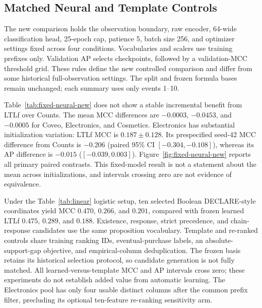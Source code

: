 \documentclass[sigconf,anonymous,nonacm]{acmart}
\newif\ifrevisions
\newcommand{\rev}[1]{\ifrevisions\textcolor{red}{#1}\else#1\fi}
\newenvironment{revblock}{\begingroup\ifrevisions\color{red}\fi}{\endgroup}
\begin{document}
\begin{revblock}
\subsection{Matched Neural and Template Controls}
\begin{table}[t]
\centering\small\setlength{\tabcolsep}{3pt}
\caption{\rev{Fixed-origin neural prediction, event 10 and $H=10$. All rows include the same first-ten-event raw encoder within each dataset. Values are mean $\pm$ sample SD over training seeds 42, 43, and 44.}}
\label{tab:fixed-neural-new}
\resizebox{\columnwidth}{!}{}
\end{table}
The new comparison holds the observation boundary, raw encoder, 64-wide classification head, 25-epoch cap, patience 5, batch size 256, and optimizer settings fixed across four conditions. Vocabularies and scalers use training prefixes only. Validation AP selects checkpoints, followed by a validation-MCC threshold grid. These rules define the new controlled comparison and differ from some historical full-observation settings. The split and frozen formula bases remain unchanged; each summary uses only events 1--10.

Table~\ref{tab:fixed-neural-new} does not show a stable incremental benefit from LTLf over Counts. The mean MCC differences are $-0.0003$, $-0.0453$, and $-0.0005$ for Coveo, Electronics, and Cosmetics. Electronics has substantial initialization variation: LTLf MCC is $0.187\pm0.128$. Its prespecified seed-42 MCC difference from Counts is $-0.206$ (paired 95\% CI $[-0.304,-0.108]$), whereas its AP difference is $-0.015$ ($[-0.039,0.003]$). Figure~\ref{fig:fixed-neural-new} reports all primary paired contrasts. This fixed-model result is not a statement about the mean across initializations, and intervals crossing zero are not evidence of equivalence.

Under the Table~\ref{tab:linear} logistic setup, ten selected Boolean DECLARE-style coordinates yield MCC $0.470$, $0.266$, and $0.201$, compared with frozen learned LTLf $0.475$, $0.289$, and $0.188$. Existence, response, strict precedence, and chain-response candidates use the same proposition vocabulary. Template and re-ranked controls share training ranking IDs, eventual-purchase labels, an absolute-support-gap objective, and empirical-column deduplication. The frozen basis retains its historical selection protocol, so candidate generation is not fully matched. All learned-versus-template MCC and AP intervals cross zero; these experiments do not establish added value from automatic learning. The Electronics pool has only four usable distinct columns after the common prefix filter, precluding its optional ten-feature re-ranking sensitivity arm.


\end{revblock}
\end{document}
